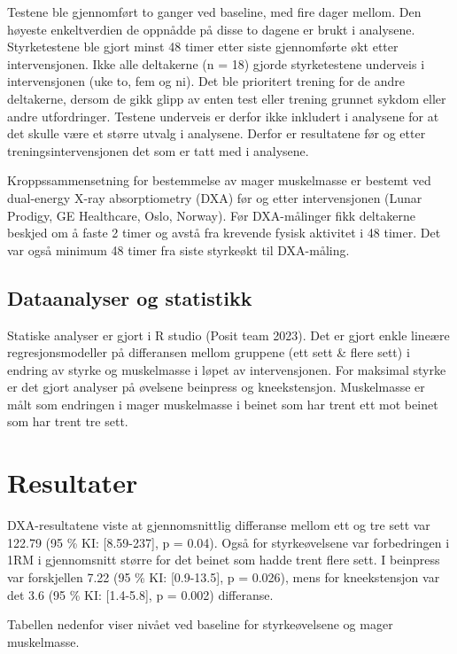 \documentclass[
  letterpaper,
  DIV=11,
  numbers=noendperiod]{scrreprt}
\begin{document}
Testene ble gjennomført to ganger ved baseline, med fire dager mellom.
Den høyeste enkeltverdien de oppnådde på disse to dagene er brukt i
analysene. Styrketestene ble gjort minst 48 timer etter siste
gjennomførte økt etter intervensjonen. Ikke alle deltakerne (n = 18)
gjorde styrketestene underveis i intervensjonen (uke to, fem og ni). Det
ble prioritert trening for de andre deltakerne, dersom de gikk glipp av
enten test eller trening grunnet sykdom eller andre utfordringer.
Testene underveis er derfor ikke inkludert i analysene for at det skulle
være et større utvalg i analysene. Derfor er resultatene før og etter
treningsintervensjonen det som er tatt med i analysene.

Kroppssammensetning for bestemmelse av mager muskelmasse er bestemt ved
dual-energy X-ray absorptiometry (DXA) før og etter intervensjonen
(Lunar Prodigy, GE Healthcare, Oslo, Norway). Før DXA-målinger fikk
deltakerne beskjed om å faste 2 timer og avstå fra krevende fysisk
aktivitet i 48 timer. Det var også minimum 48 timer fra siste styrkeøkt
til DXA-måling.

\subsection{Dataanalyser og
statistikk}\label{dataanalyser-og-statistikk}

Statiske analyser er gjort i R studio (Posit team 2023). Det er gjort
enkle lineære regresjonsmodeller på differansen mellom gruppene (ett
sett \& flere sett) i endring av styrke og muskelmasse i løpet av
intervensjonen. For maksimal styrke er det gjort analyser på øvelsene
beinpress og kneekstensjon. Muskelmasse er målt som endringen i mager
muskelmasse i beinet som har trent ett mot beinet som har trent tre
sett.

\section{Resultater}\label{resultater}

DXA-resultatene viste at gjennomsnittlig differanse mellom ett og tre
sett var 122.79 (95 \% KI: {[}8.59-237{]}, p = 0.04). Også for
styrkeøvelsene var forbedringen i 1RM i gjennomsnitt større for det
beinet som hadde trent flere sett. I beinpress var forskjellen 7.22 (95
\% KI: {[}0.9-13.5{]}, p = 0.026), mens for kneekstensjon var det 3.6
(95 \% KI: {[}1.4-5.8{]}, p = 0.002) differanse.

Tabellen nedenfor viser nivået ved baseline for styrkeøvelsene og mager
muskelmasse.
\end{document}
